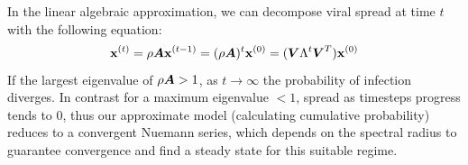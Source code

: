 \documentclass[]{exam}
\begin{document}
\begin{questions}

\newpage
\question
\hfill

In the linear algebraic approximation, we can decompose viral spread at time $t$ with the following equation:
\begin{equation*}
	\boldsymbol{\mathrm{x}}^{(t)} = \rho \boldsymbol{A} \boldsymbol{\mathrm{x}}^{(t-1)} = (\rho \boldsymbol{A})^t \boldsymbol{\mathrm{x}}^{(0)} =(\boldsymbol{V} \Lambda^t \boldsymbol{V}^T) \boldsymbol{\mathrm{x}}^{(0)}
\end{equation*}
If the largest eigenvalue of $\rho \boldsymbol{A} > 1$, as $t \rightarrow \infty$ the probability of infection diverges. In contrast for a maximum eigenvalue $< 1$, spread as timesteps progress tends to 0, thus our approximate model (calculating cumulative probability) reduces to a convergent Nuemann series, which depends on the spectral radius to guarantee convergence and find a steady state for this suitable regime.

\end{questions}
\end{document}
